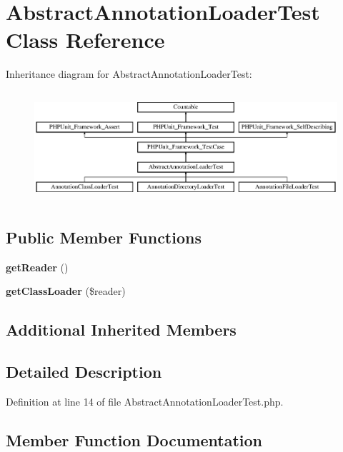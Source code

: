 \section{Abstract\+Annotation\+Loader\+Test Class Reference}
\label{class_symfony_1_1_component_1_1_routing_1_1_tests_1_1_loader_1_1_abstract_annotation_loader_test}
Inheritance diagram for Abstract\+Annotation\+Loader\+Test\+:\begin{figure}[H]
\begin{center}
\leavevmode
\includegraphics[height=4.129793cm]{class_symfony_1_1_component_1_1_routing_1_1_tests_1_1_loader_1_1_abstract_annotation_loader_test}
\end{center}
\end{figure}
\subsection*{Public Member Functions}
\begin{DoxyCompactItemize}
\item 
{\bf get\+Reader} ()
\item 
{\bf get\+Class\+Loader} (\$reader)
\end{DoxyCompactItemize}
\subsection*{Additional Inherited Members}


\subsection{Detailed Description}


Definition at line 14 of file Abstract\+Annotation\+Loader\+Test.\+php.



\subsection{Member Function Documentation}
